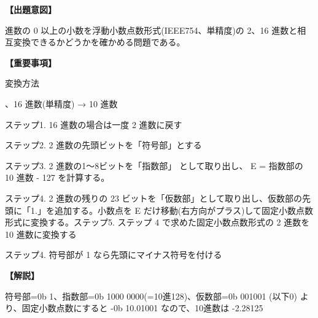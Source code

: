 \noindent \textbf{【出題意図】}

 進数の 0 以上の小数を浮動小数点数形式(IEEE754、単精度)の 2、16 進数と相互変換できるかどうかを確かめる問題である。

\vspace{1em}
\noindent \textbf{【重要事項】}

\noindent 変換方法

\medskip
{}、16 進数(単精度) → 10 進数

\noindent ステップ1.  16 進数の場合は一度 2 進数に戻す

\noindent ステップ2.  2 進数の先頭ビットを「符号部」とする

\noindent ステップ3.  2 進数の1〜8ビットを「指数部」 として取り出し、 E = 指数部の 10 進数 - 127 を計算する。

\noindent ステップ4.  2 進数の残りの 23 ビットを「仮数部」として取り出し、仮数部の先頭に「1.」を追加する。小数点を E だけ移動(右方向がプラス)して固定小数点数形式に変換する。ステップ5.  ステップ 4 で求めた固定小数点数形式の 2 進数を 10 進数に変換する

\noindent ステップ4.  符号部が 1 なら先頭にマイナス符号を付ける 


\vspace{1em}
\noindent \textbf{【解説】}

\noindent 符号部=0b 1、指数部=0b 1000 0000(=10進128)、仮数部=0b 001001 (以下0) より、固定小数点数にすると  -0b 10.01001 なので、10進数は -2.28125

